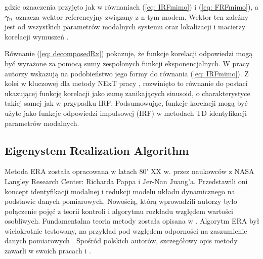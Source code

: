 gdzie oznaczenia przyjęto jak w równaniach (\ref{eq: IRFmimo}) i (\ref{eq: FRFmimo}), a $\bm{\gamma}_n$ oznacza wektor referencyjny związany z n-tym modem. Wektor ten zależny jest od wszystkich parametrów modalnych systemu oraz lokalizacji i macierzy korelacji wymuszeń \parencite{Rainieri2014, Peeters2000}. 

Równanie (\ref{eq: decomposedRx}) pokazuje, że funkcje korelacji odpowiedzi mogą być wyrażone za pomocą sumy zespolonych funkcji eksponencjalnych. W pracy \cite{SHEN2003} autorzy wskazują na podobieństwo jego formy do równania (\ref{eq: IRFmimo}). Z kolei w kluczowej dla metody NExT pracy \cite{James1995}, rozwinięto to równanie do postaci ukazującej funkcję korelacji jako sumę zanikających sinusoid, o charakterystyce takiej samej jak w przypadku IRF. Podsumowując, funkcje korelacji mogą być użyte jako funkcje odpowiedzi impulsowej (IRF) w metodach TD identyfikacji parametrów modalnych.


\subsection{Eigenystem Realization Algorithm}
Metoda ERA została opracowana w latach 80' XX w. przez naukowców z NASA Langley Research Center: Richarda Pappa i Jer-Nan Juang'a. Przedstawili oni koncept identyfikacji modalnej i redukcji modelu układu dynamicznego na podstawie danych pomiarowych. Nowością, którą wprowadzili autorzy było połączenie pojęć z teorii kontroli i algorytmu rozkładu względem wartości osobliwych. Fundamentalna teoria metody została opisana w \parencite{Pappa1985,Juang1985,Juang1986a,Juang1994}. Algorytm ERA był wielokrotnie testowany, na przykład pod względem odporności na zaszumienie danych pomiarowych \parencite{Juang1986, Li2011}. Spośród polskich autorów, szczegółowy opis metody zawarli w swoich pracach \cite{Szafranski2013} i \cite{Dudek2008}.


